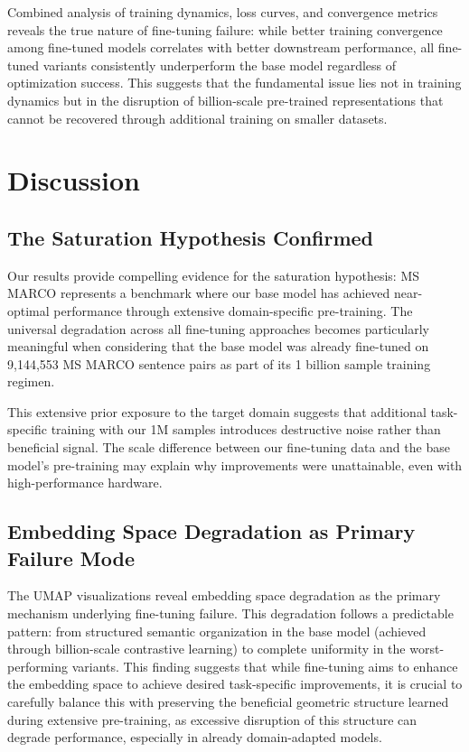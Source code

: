 \documentclass[conference]{IEEEtran}
\begin{document}
Combined analysis of training dynamics, loss curves, and convergence metrics reveals the true nature of fine-tuning failure: while better training convergence among fine-tuned models correlates with better downstream performance, all fine-tuned variants consistently underperform the base model regardless of optimization success. This suggests that the fundamental issue lies not in training dynamics but in the disruption of billion-scale pre-trained representations that cannot be recovered through additional training on smaller datasets.

\section{Discussion}
\subsection{The Saturation Hypothesis Confirmed}
Our results provide compelling evidence for the saturation hypothesis: MS MARCO represents a benchmark where our base model has achieved near-optimal performance through extensive domain-specific pre-training. The universal degradation across all fine-tuning approaches becomes particularly meaningful when considering that the base model was already fine-tuned on 9,144,553 MS MARCO sentence pairs as part of its 1 billion sample training regimen.

This extensive prior exposure to the target domain suggests that additional task-specific training with our 1M samples introduces destructive noise rather than beneficial signal. The scale difference between our fine-tuning data and the base model's pre-training may explain why improvements were unattainable, even with high-performance hardware.

\subsection{Embedding Space Degradation as Primary Failure Mode}
The UMAP visualizations reveal embedding space degradation as the primary mechanism underlying fine-tuning failure. This degradation follows a predictable pattern: from structured semantic organization in the base model (achieved through billion-scale contrastive learning) to complete uniformity in the worst-performing variants. This finding suggests that while fine-tuning aims to enhance the embedding space to achieve desired task-specific improvements, it is crucial to carefully balance this with preserving the beneficial geometric structure learned during extensive pre-training, as excessive disruption of this structure can degrade performance, especially in already domain-adapted models.
\end{document}
